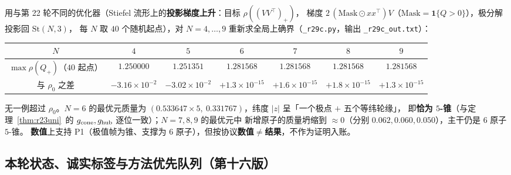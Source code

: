 用与第 22 轮不同的优化器（Stiefel 流形上的\textbf{投影梯度上升}：目标 $\rho((VV^\top)_+)$，
梯度 $2\,(\mathrm{Mask}\odot xx^\top)V$（$\mathrm{Mask}=\mathbf 1\{Q>0\}$），极分解投影回 $\mathrm{St}(N,3)$，
每 $N$ 取 $40$ 个随机起点），对 $N=4,\dots,9$ 重新求全局上确界（\texttt{\_r29c.py}，输出 \texttt{\_r29c\_out.txt}）：
\begin{center}\small
\begin{tabular}{c|cccccc}
\toprule
$N$ & $4$ & $5$ & $6$ & $7$ & $8$ & $9$\\
\midrule
$\max\rho(Q_+)$（$40$ 起点）& $1.250000$ & $1.251351$ & $\mathbf{1.281568}$ & $1.281568$ & $1.281568$ & $1.281568$\\
与 $\rho_0$ 之差 & $-3.16\times10^{-2}$ & $-3.02\times10^{-2}$ & $+1.3\times10^{-15}$ & $+1.6\times10^{-15}$ & $+1.8\times10^{-15}$ & $+1.3\times10^{-15}$\\
\bottomrule
\end{tabular}
\end{center}
无一例超过 $\rho_0$。$N=6$ 的最优元质量为 $(0.533647\times5,\ 0.331767)$，纬度 $|z|$ 呈「一个极点 $+$ 五个等纬轮缘」，
即\textbf{恰为 $5$-锥}（与定理~\ref{thm:r23uni}~的 $g_{\rm cone},g_{\rm hub}$ 逐位一致）；$N=7,8,9$ 的最优元中
新增原子的质量坍缩到 $\approx0$（分别 $0.062,0.060,0.050$），主干仍是 $6$ 原子 $5$-锥。
\textbf{数值}上支持 P1（极值帧为锥、支撑为 $6$ 原子），但按协议\textbf{数值}$\ne$\textbf{结果}，不作为证明入账。

\subsection{本轮状态、诚实标签与方法优先队列（第十六版）}\label{sec:r29:status}

